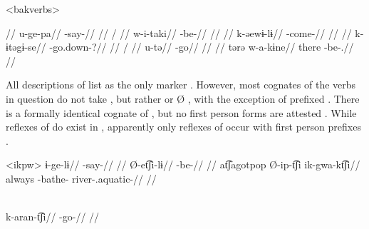 \pex[everyglpreamble=]<bakverbs> \bakairi \parencite[][131, 397, 76, 137, 374, 130]{von1892bakairi}
\begin{multicols}{2}
\begingl
\glpreamble {} //
\gla u-ge-pa//
\glb {}-say-//
\glft {}//
\endgl
{}
\begingl
\glpreamble {} /  //
\gla w-i-taki//
\glb {}-be-//
\glft {}//
\endgl
{}
\begingl
\glpreamble {} //
\gla k-əewɨ-lɨ//
\glb {}-come-//
\glft {}//
\endgl
{}
\begingl
\glpreamble {} //
\gla k-ɨtəgɨ-se//
\glb {}-go.down-?//
\glft {}//
\endgl
{}
\begingl
\glpreamble {} / //
\gla u-tə//
\glb {}-go//
\glft {}//
\endgl
{}
\begingl
\glpreamble {}//
\gla tərə w-a-kɨne//
\glb there -be-.//
\glft {}//
\endgl
\end{multicols}
\xe

All descriptions of \ikpeng list  as the only  marker \parencites[55]{ikpengpacheco1997}[105]{campetela1997analise}[64]{ikpengpacheco2001}[205]{alves2013verbo}.
However, most \ikpeng cognates of the verbs in question do not take , but rather  or Ø , with the exception of prefixed  .
There is a formally identical \ikpeng cognate of \arara {} , but no first person forms are attested .
While reflexes of   do exist in \ikpeng, apparently only reflexes of   occur with first person prefixes \parencite[401]{gildea2018reconstructing}.

\pex<ikpw>\ikpeng
{}
\begingl
\gla ɨ-ge-lɨ//
\glb {}-say-//
\glft {} \parencite[][209]{ikpengpacheco2001}//
\endgl
{}
\begingl
\gla Ø-et͡ʃi-lɨ//
\glb {}-be-//
\glft {} \parencite[][139]{ikpengpacheco2001}//
\endgl
{}
\begingl
\gla at͡ʃagotpop Ø-ip-t͡ʃi ik-gwa-kt͡ʃi//
\glb always -bathe- river-.aquatic-//
\glft {} \parencite[][68]{ikpengpacheco1997}//
\endgl
\xe

\ikpeng \parencite[][80]{ikpengpacheco2001}\\
\begingl
\gla k-aran-t͡ʃi//
\glb {}-go-//
\glft {}//
\endgl
\xe

